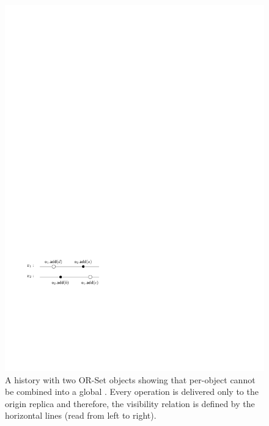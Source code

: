\begin{figure}
  \vspace{-5pt}
  \centering
  \includegraphics[width=0.35 \textwidth]{figures/TwoSubLin-NotaGlobalLin.pdf}
\vspace{-5pt}
  \caption{A history with two OR-Set objects showing that per-object  cannot be combined into a global \crdtlinearization{}. Every operation is delivered only to the origin replica and therefore, the visibility relation is defined by the horizontal lines (read from left to right).}
  \vspace{-5pt}
  \label{fig:negative_composition}
\end{figure}

